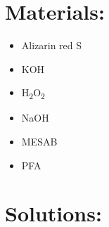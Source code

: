 \documentclass[
  letterpaper,
  DIV=11,
  numbers=noendperiod]{scrreprt}
\providecommand{\tightlist}{%
  \setlength{\itemsep}{0pt}\setlength{\parskip}{0pt}}\usepackage{longtable,booktabs,array}
\begin{document}
\hypertarget{materials-4}{%
\section{Materials:}\label{materials-4}}

\begin{itemize}
\tightlist
\item
  Alizarin red S
\item
  KOH
\item
  H\textsubscript{2}O\textsubscript{2}
\item
  NaOH
\item
  MESAB
\item
  PFA
\end{itemize}

\hypertarget{solutions-4}{%
\section{Solutions:}\label{solutions-4}}
\end{document}

